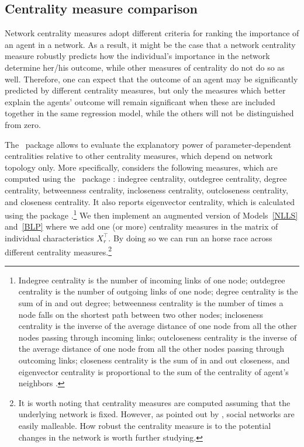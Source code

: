 \documentclass[nojss]{jss}
\begin{document}
\subsection{Centrality measure comparison}

Network centrality measures adopt different criteria for ranking the
importance of an agent in a network.  As a result, it might be the case that
a network centrality measure robustly predicts how the individual's
importance in the network determine her/his outcome, while other measures of
centrality do not do so as well.  Therefore, one can expect that the outcome
of an agent may be significantly predicted by different centrality measures,
but only the measures which better explain the agents' outcome will remain
significant when these are included together in the same regression model,
while the others will not be distinguished from zero.

The ~package  allows to evaluate the explanatory
power of parameter-dependent centralities relative to other centrality
measures, which depend on network topology only.  More specifically,
 considers the following measures, which are computed using the
~package  \citep{igraph}: indegree centrality,
outdegree centrality, degree centrality, betweenness centrality, incloseness
centrality, outcloseness centrality, and closeness centrality.  It also
reports eigenvector centrality, which is calculated using the 
package  \citep{sna}.\footnote{Indegree centrality is the number of
incoming links of one node; outdegree centrality is the number of outgoing
links of one node; degree centrality is the sum of in and out degree;
betweenness centrality is the number of times a node falls on the shortest
path between two other nodes; incloseness centrality is the inverse of the
average distance of one node from all the other nodes passing through
incoming links; outcloseness centrality is the inverse of the average
distance of one node from all the other nodes passing through outcoming
links; closeness centrality is the sum of in and out closeness, and
eigenvector centrality is proportional to the sum of the centrality of
agent's neighbors \cite[see][for further details]{Jackson:2010}.} We then
implement an augmented version of Models~\ref{NLLS} and~\ref{BLP} where
we add one (or more) centrality measures in the matrix of individual
characteristics $X_{r}^\top.$ By doing so we can run an horse race across
different centrality measures.\footnote{It is worth noting that centrality
measures are computed assuming that the underlying network is fixed. 
However, as pointed out by \cite{An:2015b}, social networks are easily
malleable.  How robust the centrality measure is to the potential changes in
the network is worth further studying.}
\end{document}
